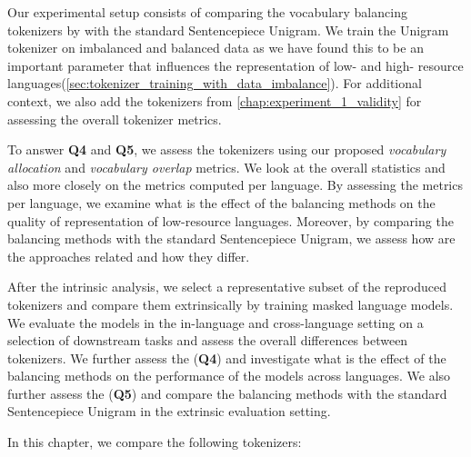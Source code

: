 
Our experimental setup consists of comparing the vocabulary balancing tokenizers by \citet{chung_improving_2020,zheng_allocating_2021,liang_xlm-v_2023} with the standard Sentencepiece Unigram. We train the Unigram tokenizer on imbalanced and balanced data as we have found this to be an important parameter that influences the representation of low- and high- resource languages(\autoref{sec:tokenizer_training_with_data_imbalance}). For additional context, we also add the tokenizers from \autoref{chap:experiment_1_validity} for assessing the overall tokenizer metrics.

To answer \textbf{Q4} and \textbf{Q5}, we assess the tokenizers using our proposed \textit{vocabulary allocation} and \textit{vocabulary overlap} metrics. We look at the overall statistics and also more closely on the metrics computed per language. By assessing the metrics per language, we examine what is the effect of the balancing methods on the quality of representation of low-resource languages. Moreover, by comparing the balancing methods with the standard Sentencepiece Unigram, we assess how are the approaches related and how they differ.

After the intrinsic analysis, we select a representative subset of the reproduced tokenizers and compare them extrinsically by training masked language models. We evaluate the models in the in-language and cross-language setting on a selection of downstream tasks and assess the overall differences between tokenizers. We further assess the (\textbf{Q4}) and investigate what is the effect of the balancing methods on the performance of the models across languages. We also further assess the (\textbf{Q5}) and compare the balancing methods with the standard Sentencepiece Unigram in the extrinsic evaluation setting.

In this chapter, we compare the following tokenizers:

